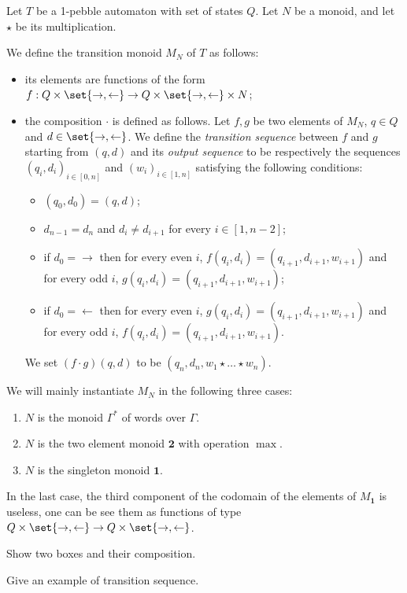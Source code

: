    
\begin{definition}%
Let $T$ be a 1-pebble automaton with set of states $Q$. Let $N$ be a monoid, and let $\star$ be its multiplication.

We define the transition monoid $M_N$ of $T$ as follows:
\begin{itemize}
\item its elements are functions of the form $f:Q\times\set{\rightarrow,\leftarrow}\to Q\times\set{\rightarrow,\leftarrow}\times N$;
\item the composition $\cdot$ is defined as follows. Let $f, g$ be two elements of $M_N$, $q\in Q$ and $d\in\set{\rightarrow, \leftarrow}$. We define the \emph{transition sequence} between 
$f$ and $g$ starting from $(q,d)$ and its \emph{output sequence} to be respectively the sequences $(q_i,d_i)_{i\in[0,n]}$ and  $(w_i)_{i\in[1,n]}$ satisfying the following conditions: 
\begin{itemize}
\item $(q_0,d_0)=(q,d)$;
\item $d_{n-1}=d_{n}$ and $d_i\neq d_{i+1}$ for every $i\in[1,n-2]$;
\item if $d_0=\rightarrow$ then for every even $i$, $f(q_i,d_i)=(q_{i+1},d_{i+1}, w_{i+1})$ and for every odd $i$, $g(q_i,d_i)=(q_{i+1},d_{i+1}, w_{i+1})$;
\item if $d_0=\leftarrow$ then for every even $i$, $g(q_i,d_i)=(q_{i+1},d_{i+1}, w_{i+1})$ and for every odd $i$, $f(q_i,d_i)=(q_{i+1},d_{i+1}, w_{i+1})$. 
\end{itemize}
We set $(f\cdot g) (q,d)$ to be $(q_n, d_n, w_1\star\dots\star w_n)$.
\end{itemize}
\end{definition}
We will mainly instantiate $M_N$ in the following three cases: 
\begin{enumerate}
\item $N$ is the monoid $\Gamma^*$ of words over $\Gamma$.
\item $N$ is the two element monoid $\mathbf 2$ with operation $\max$.
\item $N$ is the singleton monoid $\mathbf 1$.
\end{enumerate}
In the last case, the third component of the codomain of the elements of $M_{\mathbf 1}$ is useless, one can be see them as functions of type $Q\times\set{\rightarrow,\leftarrow}\to Q\times\set{\rightarrow,\leftarrow}$.

\begin{example}
\begin{center}
Show two boxes and their composition.

Give an example of transition sequence.
\end{center}
\end{example}

